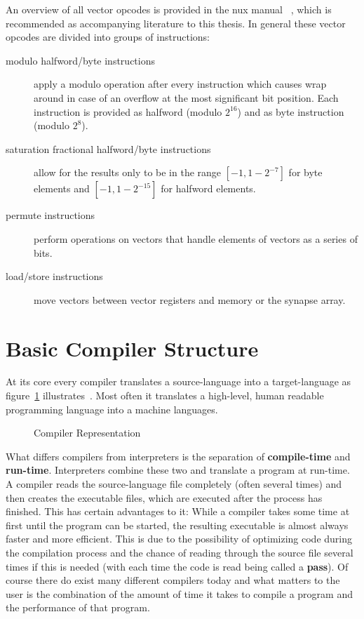 {An overview of all vector opcodes is provided in the nux manual ~\cite[ch.~5]{nuxmanual}, which is recommended as accompanying literature to this thesis.
In general these vector opcodes are divided into groups of instructions:
\begin{description}
    \item[modulo halfword/byte instructions] apply a modulo operation after every instruction which causes wrap around in case of an overflow at the most significant bit position.
        Each instruction is provided as halfword (modulo $2^{16}$) and as byte instruction (modulo $2^{8}$).
    \item[saturation fractional halfword/byte instructions] allow for the results only to be in the range $[-1, 1-2^{-7}]$ for byte elements and $[-1, 1-2^{-15}]$ for halfword elements.
    \item[permute instructions] perform operations on vectors that handle elements of vectors as a series of bits.
    \item[load/store instructions] move vectors between vector registers and memory or the synapse array.
\end{description}


\section{Basic Compiler Structure}
\label{section:compiler}

At its core every compiler translates a source-language into a target-language as figure~\ref{fig:compiler} illustrates~\cite[p.~3]{UBHD-66483012}.
Most often it translates a high-level, human readable programming language into a machine languages.

\begin{figure}
    \captionsetup{format=plain, indention=.6cm, labelsep=newline,singlelinecheck=false}
    \centering
    \vspace*{-3em}
    
    \caption{\label{fig:compiler} Compiler Representation}
\end{figure}

What differs compilers from interpreters is the separation of \textbf{compile-time} and \textbf{run-time}.
Interpreters combine these two and translate a program at run-time.
A compiler reads the source-language file completely (often several times) and then creates the executable files, which are executed after the process has finished.
This has certain advantages to it:
While a compiler takes some time at first until the program can be started, the resulting executable is almost always faster and more efficient.
This is due to the possibility of optimizing code during the compilation process and the chance of reading through the source file several times if this is needed (with each time the code is read being called a \textbf{pass}).
Of course there do exist many different compilers today and what matters to the user is the combination of the amount of time it takes to compile a program and the performance of that program.

}

